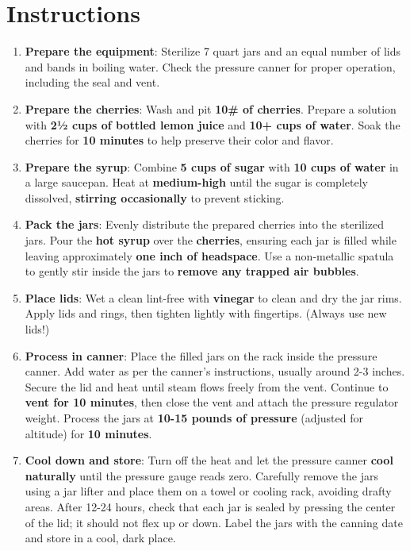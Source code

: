 \documentclass[11pt,letterpaper]{article}
\begin{document}
\section*{Instructions}
\begin{enumerate}
    \item \textbf{Prepare the equipment}: Sterilize 7 quart jars and an equal number of lids and bands in boiling water. Check the pressure canner for proper operation, including the seal and vent.
    \item \textbf{Prepare the cherries}: Wash and pit \textbf{10\# of cherries}. Prepare a solution with \textbf{2½ cups of bottled lemon juice} and \textbf{10+ cups of water}. Soak the cherries for \textbf{10 minutes} to help preserve their color and flavor.
    \item \textbf{Prepare the syrup}: Combine \textbf{5 cups of sugar} with \textbf{10 cups of water} in a large saucepan. Heat at \textbf{medium-high} until the sugar is completely dissolved, \textbf{stirring occasionally} to prevent sticking.
    \item \textbf{Pack the jars}: Evenly distribute the prepared cherries into the sterilized jars. Pour the \textbf{hot syrup} over the \textbf{cherries}, ensuring each jar is filled while leaving approximately \textbf{one inch of headspace}. Use a non-metallic spatula to gently stir inside the jars to \textbf{remove any trapped air bubbles}.
    \item \textbf{Place lids}: Wet a clean lint-free with \textbf{vinegar} to clean and dry the jar rims. Apply lids and rings, then tighten lightly with fingertips. (Always use new lids!)
    \item \textbf{Process in canner}: Place the filled jars on the rack inside the pressure canner. Add water as per the canner's instructions, usually around 2-3 inches. Secure the lid and heat until steam flows freely from the vent. Continue to \textbf{vent for 10 minutes}, then close the vent and attach the pressure regulator weight. Process the jars at \textbf{10-15 pounds of pressure} (adjusted for altitude) for \textbf{10 minutes}.
    \item \textbf{Cool down and store}: Turn off the heat and let the pressure canner \textbf{cool naturally} until the pressure gauge reads zero. Carefully remove the jars using a jar lifter and place them on a towel or cooling rack, avoiding drafty areas. After 12-24 hours, check that each jar is sealed by pressing the center of the lid; it should not flex up or down. Label the jars with the canning date and store in a cool, dark place.
\end{enumerate}
\end{document}
